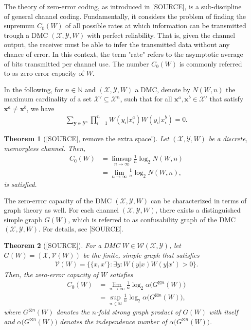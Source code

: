 \documentclass[conference]{IEEEtran}
\def\X{{\mathcal X}}
\def\Y{{\mathcal Y}}
\def\V{{\mathcal V}}
\def\W{{\mathcal W}}
\def\NN{{\mathbb N}}
\newcommand{\sdummy}{{\color{red}[SOURCE]}}
\newtheorem{Theorem}{Theorem}
\begin{document}
	The theory of zero-error coding, as introduced in \sdummy, is a sub-discipline of general channel coding. Fundamentally, it considers the problem of finding the supremum 
	\(C_0(W)\) of all possible rates at which information can be transmitted trough a DMC \((\X,\Y,W)\) with perfect reliability. That is, given the channel output, the receiver must 
	be able to infer the transmitted data without any chance of error. In this context, the term "rate" refers to the asymptotic average of bits transmitted per channel use. 
	The number \(C_0(W)\) is commonly referred to as zero-error capacity of \(W\).

	In the following, for \(n\in\NN\) and \((\X,\Y,W)\) a DMC, denote by \(N(W,n)\) the maximum cardinality of a set \(\X'\subseteq \X^n\), such that for all \(\bm{x}^a,\bm{x}^b\in\X'\) 
	that satisfy \(\bm{x}^a \neq \bm{x}^b\), we have 
	\begin{align}	\sum_{\bm{y}\in\Y^n}\prod_{i=1}^{n} W(y_i|x_i^a)W(y_i|x_i^b) = 0.
	\end{align}

	\begin{Theorem} [\sdummy, {\color{red} remove the extra space!}]
					\label{Shannon}
					Let \((\X,\Y,W)\) be a discrete, memoryless channel. Then,
					\begin{align}	C_0(W)  &   = \limsup_{n\to\infty} \frac{1}{n} \log_2 N(W,n)\\
											&   = \lim_{n \to \infty} \frac{1}{n} \log_2 N(W,n),
					\end{align}
					is satisfied.
	\end{Theorem}

	The zero-error capacity of the DMC \((\X,\Y,W)\) can be characterized in terms of graph theory as well. For each channel \((\X,\Y,W)\), there exists a distinguished simple graph \(G(W)\), 
	which is referred to as confusability graph of the DMC \((\X,\Y,W)\). For details, see \sdummy. 

	\begin{Theorem}	[\sdummy]\label{thm:ZE_Capacity}
					For a DMC \(W\in\W(\X,\Y)\), let \(G(W) = (\X, \V(W))\) be the finite, simple graph that satisfies
					\begin{align}   \V(W) = \big\{\{x,x'\} : \exists y : W(y|x)W(y|x') > 0\big\}.
					\end{align}
					Then, the zero-error capacity of \(W\) satisfies
					\begin{align}   C_0(W)  &=  \lim_{n\to\infty} \frac{1}{n} \log_2 \alpha\big(G^{\boxtimes n }(W)\big) \\
											&=  \sup_{n\in\NN} \frac{1}{n} \log_2 \alpha\big(G^{\boxtimes n }(W)\big),
					\end{align}
					where \(G^{\boxtimes n }(W)\) denotes the \(n\)-fold \emph{strong graph product} of \(G(W)\) with itself and
					\(\alpha\big(G^{\boxtimes n }(W)\big)\) denotes the \emph{independence number} of \(\alpha\big(G^{\boxtimes n }(W)\big)\).
	\end{Theorem}
\end{document}

